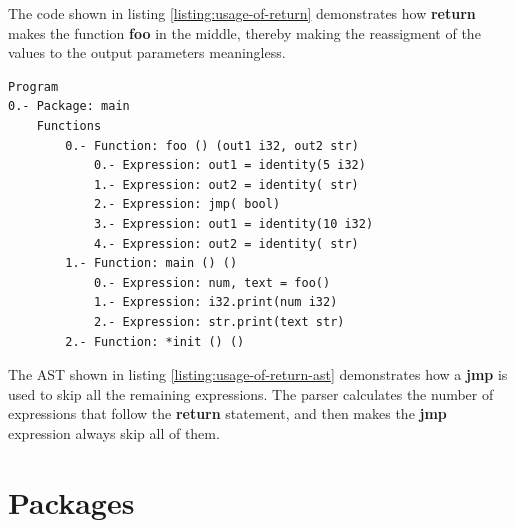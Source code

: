 \documentclass[11pt,fleqn,openany]{book} %
\begin{document}
The code shown in listing \ref{listing:usage-of-return} demonstrates how \textbf{return} makes the function \textbf{foo} in the middle, thereby making the reassigment of the values to the output parameters meaningless.

\begin{lstlisting}[caption={Abstract syntax tree of listing \ref{listing:usage-of-return}},captionpos=b,label={listing:usage-of-return-ast}]
Program
0.- Package: main
	Functions
		0.- Function: foo () (out1 i32, out2 str)
			0.- Expression: out1 = identity(5 i32)
			1.- Expression: out2 = identity( str)
			2.- Expression: jmp( bool)
			3.- Expression: out1 = identity(10 i32)
			4.- Expression: out2 = identity( str)
		1.- Function: main () ()
			0.- Expression: num, text = foo()
			1.- Expression: i32.print(num i32)
			2.- Expression: str.print(text str)
		2.- Function: *init () ()
\end{lstlisting}

The AST shown in listing \ref{listing:usage-of-return-ast} demonstrates how a \textbf{jmp} is used to skip all the remaining expressions. The parser calculates the number of expressions that follow the \textbf{return} statement, and then makes the \textbf{jmp} expression always skip all of them.


\chapter{Packages}
\label{chapter:packages}
\end{document}
